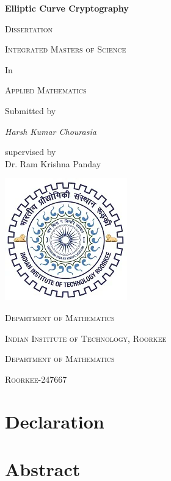 \documentclass[12pt,a4paper]{report}
\begin{document}
\begin{titlepage}

	\begingroup
	\centering
	{\huge\bfseries Elliptic Curve Cryptography\par}
	\vspace{1cm}
	{\scshape\Large Dissertation\par}
	\vspace{1.5cm}
	{\scshape\LARGE Integrated Masters of Science \par}
	In\\
	{\scshape\LARGE Applied Mathematics \par}
	\vspace{2cm}
	Submitted by\\
	{\Large\itshape Harsh Kumar Chourasia\par}
	\vspace{0.5cm}
	supervised by\\
	Dr. Ram Krishna Panday
	\vspace{0.5cm}
	
	\includegraphics[scale=0.75]{logo}
	
	\vspace{1cm}
	
	{\scshape\large Department of Mathematics\par}
	{\scshape\large Indian Institute of Technology, Roorkee\par}
	{\scshape\large Department of Mathematics\par}
	{\scshape\large Roorkee-247667\par}
	\endgroup
\end{titlepage}

	\section*{Declaration}
	\cleardoublepage	

	\section*{Abstract}
	\cleardoublepage
\end{document}
